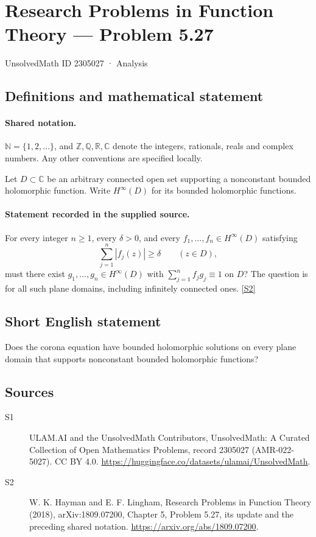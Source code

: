 \documentclass[11pt]{article}
\newcommand{\sref}[2]{\hyperlink{source:#1:#2}{[S#2]}}
\begin{document}
\setcounter{section}{2305026}
\section{Research Problems in Function Theory — Problem 5.27}\label{2305027}
{\small\sffamily UnsolvedMath ID 2305027 · Analysis}
\subsection{Definitions and mathematical statement}

\paragraph{Shared notation.}$\mathbb N=\{1,2,\ldots\}$, and $\mathbb Z,\mathbb Q,\mathbb R,\mathbb C$ denote the integers, rationals, reals and complex numbers. Any other conventions are specified locally.


Let $D\subset\mathbb C$ be an arbitrary connected open set supporting a nonconstant bounded holomorphic function. Write $H^\infty(D)$ for its bounded holomorphic functions.
\paragraph{Statement recorded in the supplied source.}
For every integer $n\ge1$, every $\delta>0$, and every $f_1,\ldots,f_n\in H^\infty(D)$ satisfying
\[\sum_{j=1}^n|f_j(z)|\ge\delta\qquad(z\in D),\]
must there exist $g_1,\ldots,g_n\in H^\infty(D)$ with $\sum_{j=1}^n f_jg_j\equiv1$ on $D$? The question is for all such plane domains, including infinitely connected ones. \sref{2305027}{2}
\subsection{Short English statement}
Does the corona equation have bounded holomorphic solutions on every plane domain that supports nonconstant bounded holomorphic functions?
\subsection{Sources}
\begin{description}
\item[\hypertarget{source:2305027:1}{S1}] ULAM.AI and the UnsolvedMath Contributors, UnsolvedMath: A Curated Collection of Open Mathematics Problems, record 2305027 (AMR-022-5027). CC BY 4.0. \url{https://huggingface.co/datasets/ulamai/UnsolvedMath}.
\item[\hypertarget{source:2305027:2}{S2}] W. K. Hayman and E. F. Lingham, Research Problems in Function Theory (2018), arXiv:1809.07200, Chapter 5, Problem 5.27, its update and the preceding shared notation. \url{https://arxiv.org/abs/1809.07200}.
\end{description}
\label{end:2305027}
\end{document}
